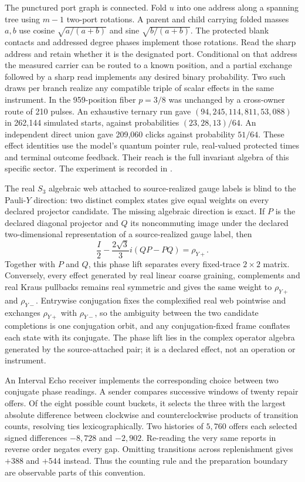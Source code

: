 \documentclass[11pt]{article}
\begin{document}
The punctured port graph is connected. Fold \(u\) into one address along a
spanning tree using \(m-1\) two-port rotations. A parent and child carrying
folded masses \(a,b\) use cosine \(\sqrt{a/(a+b)}\) and sine
\(\sqrt{b/(a+b)}\). The protected blank contacts and addressed degree
phases implement those rotations. Read the sharp address and retain
whether it is the designated port. Conditional on that address the measured
carrier can be routed to a known position, and a partial exchange followed
by a sharp read implements any desired binary probability. Two such draws
per branch realize any compatible triple of scalar effects in the same
instrument. In the 959-position fiber \(p=3/8\) was unchanged by a
cross-owner route of 210 pulses. An exhaustive ternary run gave
\((94{,}245,114{,}811,53{,}088)\) in 262,144 simulated starts, against
probabilities \((23,28,13)/64\). An independent direct union gave
209,060 clicks against probability \(51/64\). These effect identities use
the model's quantum pointer rule, real-valued protected times and terminal
outcome feedback. Their reach is the full invariant algebra of this
specific sector. The experiment is recorded in
.

The real \(S_3\) algebraic web attached to source-realized gauge labels is
blind to the Pauli-\(Y\) direction: two distinct complex states give equal
weights on every declared projector candidate. The missing algebraic
direction is exact. If \(P\) is the declared diagonal projector and \(Q\) its
noncommuting image under the declared two-dimensional representation of a
source-realized gauge label, then
\[
 \frac{I}{2}-\frac{2\sqrt3}{3}i(QP-PQ)=\rho_{Y+}.
\]
Together with \(P\) and \(Q\), this phase lift separates every fixed-trace
\(2\times2\) matrix. Conversely, every effect generated by real linear
coarse graining, complements and real Kraus pullbacks remains real symmetric
and gives the same weight to \(\rho_{Y+}\) and \(\rho_{Y-}\). Entrywise
conjugation fixes the complexified real web pointwise and exchanges
\(\rho_{Y+}\) with \(\rho_{Y-}\), so the ambiguity between the two candidate
completions is one conjugation orbit, and any conjugation-fixed frame
conflates each state with its conjugate. The phase lift lies in the complex
operator algebra generated by the source-attached pair; it is a declared
effect, not an operation or instrument.

An Interval Echo receiver implements the corresponding choice between
two conjugate phase readings. A sender compares successive windows of
twenty repair offers. Of the eight possible count buckets, it selects
the three with the largest absolute difference between clockwise and
counterclockwise products of transition counts, resolving ties
lexicographically. Two histories of $5{,}760$ offers each selected
signed differences $-8{,}728$ and $-2{,}902$. Re-reading the very same
reports in reverse order negates every gap. Omitting transitions across
replenishment gives $+388$ and $+544$ instead. Thus the counting rule
and the preparation boundary are observable parts of this convention.
\end{document}
